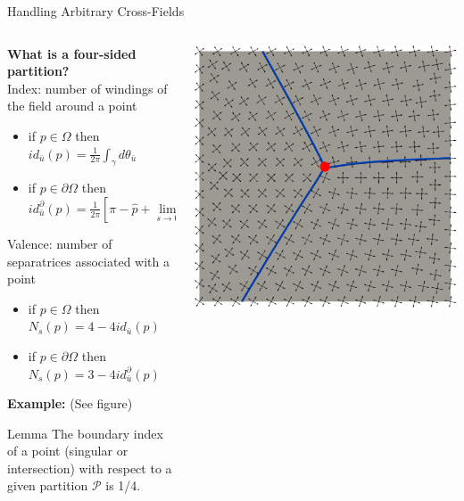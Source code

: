 \documentclass[compress,10pt,aspectratio=169]{beamer}
\begin{document}
\begin{frame}{Handling Arbitrary Cross-Fields}
\small
\vspace{-0.2cm}
  \begin{columns}
    \begin{column}{0.7\textwidth}
{\bf What is a four-sided partition?}\\\vspace{0.2cm}
    {\color{onera} Index:} number of windings of the field around a point
\begin{itemize}
    \item if $p\in\Omega$ then $id_{\bar{u}}(p) = \frac{1}{2\pi}\int_\gamma d\theta_{\bar{u}}$
    \item if $p\in\partial\Omega$ then $id^\partial_{\bar{u}}(p)=\frac{1}{2\pi}\left[\pi-\hat{p}+\lim\limits_{s\rightarrow 0}\int_s^{1-s}d\theta_{\bar{u}}^\gamma\right]$
\end{itemize}
{\color{onera} Valence:} number of separatrices associated with a point
\begin{itemize}
    \item if $p\in\Omega$ then $N_s(p) = 4-4id_{\bar{u}}(p)$
    \item if $p\in\partial\Omega$ then $N_s(p) = 3-4id^\partial_{\bar{u}}(p)$
\end{itemize}
{\bf Example:} (See figure)\\\vspace{0.1cm}
\begin{onerablock}{\small  Lemma}
    \small The boundary index of a point (singular or intersection) with respect to a given partition $\mathcal{P}$ is 1/4.
\end{onerablock}
    \end{column}
    \begin{column}{0.3\textwidth}
        \centering
  \includegraphics[scale=0.1]{images/sepa_3.pdf}

\end{column}
\end{columns}
\end{frame}
\end{document}
